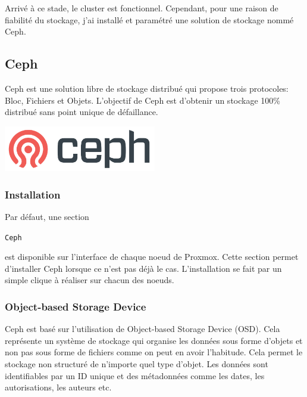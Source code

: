 \documentclass[12pt, a4paper, twoside]{article}
\begin{document}
Arrivé à ce stade, le \gls{cluster} est fonctionnel. 
Cependant, pour une raison de fiabilité du stockage, j'ai installé et paramétré une solution de stockage nommé \gls{Ceph}.

\newpage
\subsection{Ceph}
\noindent%
\begin{minipage}{.7\textwidth}%
\gls{Ceph} est une solution libre de stockage distribué qui propose trois protocoles: Bloc, Fichiers et Objets.
L'objectif de \gls{Ceph} est d'obtenir un stockage 100\% distribué sans point unique de défaillance.

\end{minipage}%
\hfill
\begin{minipage}{.3\textwidth}%
\begin{center}
\includegraphics[width=0.5\textwidth]{src/logo_ceph.png}
\end{center}
\end{minipage}%

\subsubsection{Installation}
Par défaut, une section \begin{code}\texttt{\gls{Ceph}}\end{code} est disponible sur l'interface de chaque noeud de \gls{Proxmox}. 
Cette section permet d'installer \gls{Ceph} lorsque ce n'est pas déjà le cas.
L'installation se fait par un simple clique à réaliser sur chacun des noeuds.

\subsubsection{Object-based Storage Device}
\gls{Ceph} est basé sur l'utilisation de Object-based Storage Device (\gls{OSD}).
Cela représente un système de stockage qui organise les données sous forme d'objets et non pas sous forme de fichiers comme on peut en avoir l'habitude.
Cela permet le stockage non structuré de n'importe quel type d'objet.
Les données sont identifiables par un ID unique et des métadonnées comme les dates, les autorisations, les auteurs etc.
\end{document}
